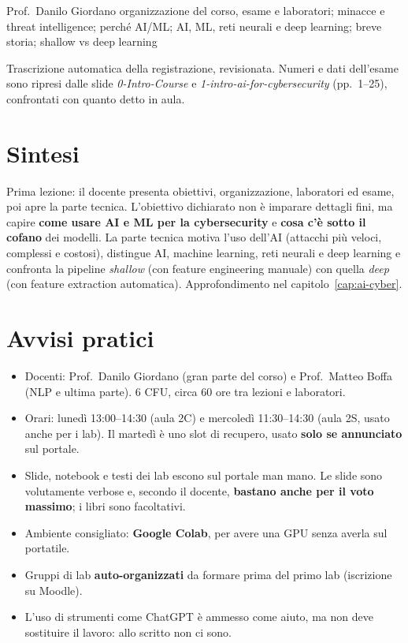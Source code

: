   {Prof.~Danilo Giordano}
  {organizzazione del corso, esame e laboratori; minacce e threat intelligence; perché AI/ML;
   AI, ML, reti neurali e deep learning; breve storia; shallow vs deep learning}
\label{lez:2026-09-21}

\begin{nota}[Fonte]
Trascrizione automatica della registrazione, revisionata. Numeri e dati dell'esame sono ripresi dalle
slide \emph{0-Intro-Course} e \emph{1-intro-ai-for-cybersecurity} (pp.~1--25), confrontati con quanto
detto in aula.
\end{nota}

\section{Sintesi}
Prima lezione: il docente presenta obiettivi, organizzazione, laboratori ed esame, poi apre la parte
tecnica. L'obiettivo dichiarato non è imparare dettagli fini, ma capire \textbf{come usare AI e ML per
la cybersecurity} e \textbf{cosa c'è sotto il cofano} dei modelli. La parte tecnica motiva l'uso
dell'AI (attacchi più veloci, complessi e costosi), distingue AI, machine learning, reti neurali e deep
learning e confronta la pipeline \emph{shallow} (con feature engineering manuale) con quella
\emph{deep} (con feature extraction automatica). Approfondimento nel capitolo~\ref{cap:ai-cyber}.

\section{Avvisi pratici}
\begin{itemize}
  \item Docenti: Prof.~Danilo Giordano (gran parte del corso) e Prof.~Matteo Boffa (NLP e ultima
    parte). 6 CFU, circa 60 ore tra lezioni e laboratori.
  \item Orari: lunedì 13:00--14:30 (aula 2C) e mercoledì 11:30--14:30 (aula 2S, usato anche per i
    lab). Il martedì è uno slot di recupero, usato \textbf{solo se annunciato} sul portale.
  \item Slide, notebook e testi dei lab escono sul portale man mano. Le slide sono volutamente
    verbose e, secondo il docente, \textbf{bastano anche per il voto massimo}; i libri sono facoltativi.
  \item Ambiente consigliato: \textbf{Google Colab}, per avere una GPU senza averla sul portatile.
  \item Gruppi di lab \textbf{auto-organizzati} da formare prima del primo lab (iscrizione su Moodle).
  \item L'uso di strumenti come ChatGPT è ammesso come aiuto, ma non deve sostituire il lavoro:
    allo scritto non ci sono.
\end{itemize}

